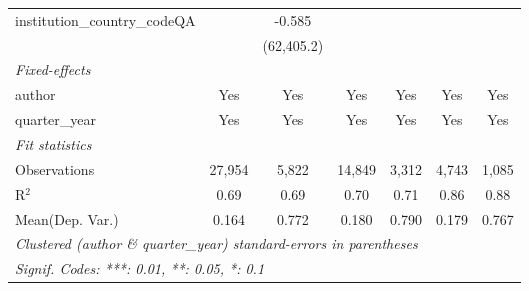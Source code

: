 \begin{tabular}{lcccccc}
   institution\_country\_codeQA          &               & -0.585      &               &              &              &   \\   
                                         &               & (62,405.2)  &               &              &              &   \\   
   \midrule
   \emph{Fixed-effects}\\
   author                                & Yes           & Yes         & Yes           & Yes          & Yes          & Yes\\  
   quarter\_year                         & Yes           & Yes         & Yes           & Yes          & Yes          & Yes\\  
   \midrule
   \emph{Fit statistics}\\
   Observations                          & 27,954        & 5,822       & 14,849        & 3,312        & 4,743        & 1,085\\  
   R$^2$                                 & 0.69          & 0.69        & 0.70          & 0.71         & 0.86         & 0.88\\  
Mean(Dep. Var.) & 0.164 & 0.772 & 0.180 & 0.790 & 0.179 & 0.767 \\
   \midrule \midrule
   \multicolumn{7}{l}{\emph{Clustered (author \& quarter\_year) standard-errors in parentheses}}\\
   \multicolumn{7}{l}{\emph{Signif. Codes: ***: 0.01, **: 0.05, *: 0.1}}\\
\end{tabular}
\par\endgroup
